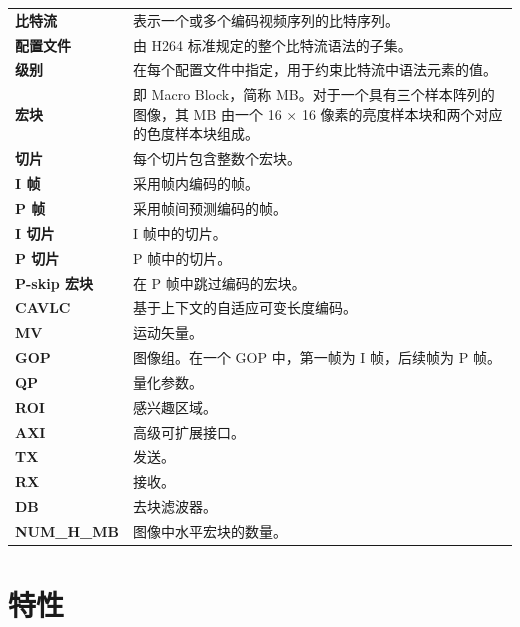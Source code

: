 \documentclass[main\_\_CN.tex]{subfiles}
\begin{document}
\begin{longtable}[c]{ R{4cm} p{12cm} }
    \textbf{比特流} & 表示一个或多个编码视频序列的比特序列。 \\
    \textbf{配置文件} & 由 H264 标准规定的整个比特流语法的子集。 \\
    \textbf{级别} & 在每个配置文件中指定，用于约束比特流中语法元素的值。 \\
    \textbf{宏块} & 即 Macro Block，简称 MB。对于一个具有三个样本阵列的图像，其 MB 由一个 16 × 16 像素的亮度样本块和两个对应的色度样本块组成。 \\
    \textbf{切片} & 每个切片包含整数个宏块。 \\
    \textbf{I 帧} & 采用帧内编码的帧。 \\
    \textbf{P 帧} & 采用帧间预测编码的帧。 \\
    \textbf{I 切片} & I 帧中的切片。 \\
    \textbf{P 切片} & P 帧中的切片。 \\
    \textbf{P-skip 宏块} & 在 P 帧中跳过编码的宏块。 \\
    \textbf{CAVLC} & 基于上下文的自适应可变长度编码。 \\
    \textbf{MV} & 运动矢量。 \\
    \textbf{GOP} & 图像组。在一个 GOP 中，第一帧为 I 帧，后续帧为 P 帧。 \\
    \textbf{QP} & 量化参数。 \\
    \textbf{ROI} & 感兴趣区域。 \\
    \textbf{AXI} & 高级可扩展接口。 \\
    \textbf{TX} & 发送。 \\
    \textbf{RX} & 接收。 \\
    \textbf{DB} & 去块滤波器。\\
    \textbf{NUM\_H\_MB} & 图像中水平宏块的数量。\\
    \end{longtable}


\section{特性}
\label{sec:h264enc-features}
\end{document}
